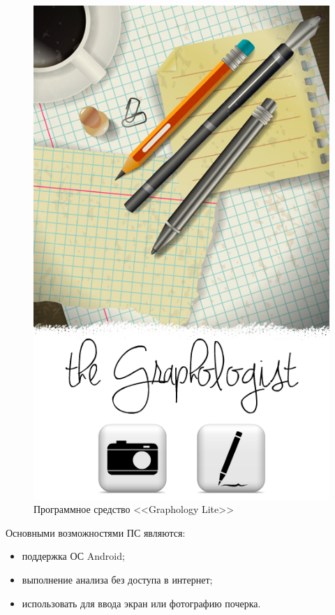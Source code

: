 \begin{figure}[h]
    \centering
    \label{fig:domain:analogs:graphology_lite}
    \includegraphics[height=0.5\textheight]{figures/analog_graphology_lite.png}
    \caption{Программное средство <<Graphology Lite>>}
\end{figure}

Основными возможностями ПС являются:
\begin{itemize}
  \item поддержка ОС Android;
  \item выполнение анализа без доступа в интернет;
  \item использовать для ввода экран или фотографию почерка.
\end{itemize}

